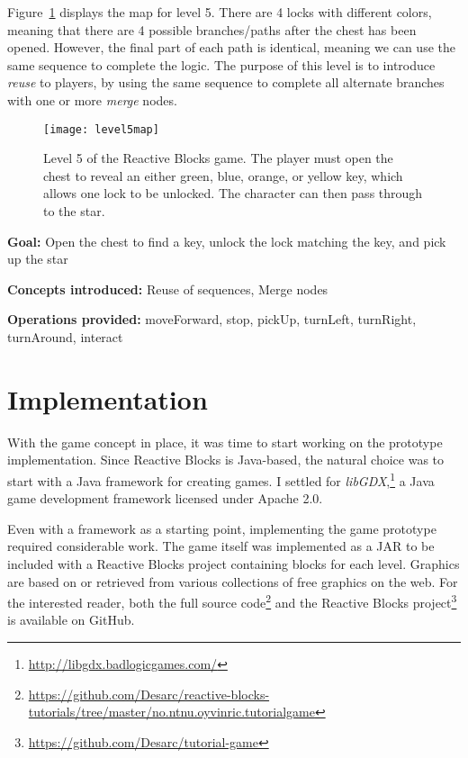 \noindent
Figure~\ref{fig:level5map} displays the map for level 5. There are 4 locks with different colors, meaning that there are 4 possible branches/paths after the chest has been opened. However, the final part of each path is identical, meaning we can use the same sequence to complete the logic. The purpose of this level is to introduce \emph{reuse} to players, by using the same sequence to complete all alternate branches with one or more \emph{merge} nodes.

\begin{figure}[htp]
	\centering
	\texttt{[image: level5map]}
	\caption[Level 5 of the Reactive Blocks game]{Level 5 of the Reactive Blocks game. The player must open the chest to reveal an either green, blue, orange, or yellow key, which allows one lock to be unlocked. The character can then pass through to the star.}
	\label{fig:level5map}
\end{figure}

\noindent
\textbf{Goal:} Open the chest to find a key, unlock the lock matching the key, and pick up the star

\noindent
\textbf{Concepts introduced:} Reuse of sequences, Merge nodes

\noindent
\textbf{Operations provided:} moveForward, stop, pickUp, turnLeft, turnRight, turnAround, interact

\section{Implementation}
\label{sec:game_implementation}
With the game concept in place, it was time to start working on the prototype implementation. Since Reactive Blocks is Java-based, the natural choice was to start with a Java framework for creating games. I settled for \emph{libGDX},\footnote{\url{http://libgdx.badlogicgames.com/}} a Java game development framework licensed under Apache 2.0.

\noindent
Even with a framework as a starting point, implementing the game prototype required considerable work. The game itself was implemented as a JAR to be included with a Reactive Blocks project containing blocks for each level. Graphics are based on or retrieved from various collections of free graphics on the web. For the interested reader, both the full source code\footnote{\url{https://github.com/Desarc/reactive-blocks-tutorials/tree/master/no.ntnu.oyvinric.tutorialgame}} and the Reactive Blocks project\footnote{\url{https://github.com/Desarc/tutorial-game}} is available on GitHub.

